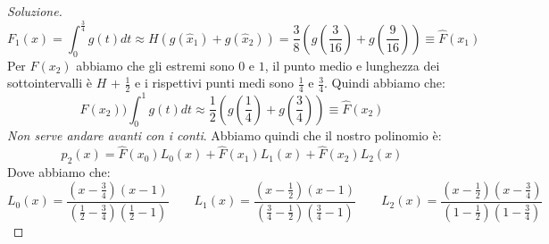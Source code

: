 \documentclass[11pt,a4paper,twoside]{article}
\theoremstyle{definition}
\newenvironment{sol}
	{\renewcommand\qedsymbol{$\blacksquare$}\begin{proof}[Soluzione]}
	{\end{proof}}
\begin{document}
\begin{sol}
	\[ F_1(x) = \int_0^{\frac 34} g(t)dt \approx H(g(\hat x_1) + g(\hat x_2)) = \frac 38 \left( g\left(\frac 3{16}\right) + g\left( \frac 9{16} \right)  \right) \equiv \hat F(x_1) \]
	Per $F(x_2)$ abbiamo che gli estremi sono $0$ e $1$, il punto medio e lunghezza dei sottointervalli è $H$ + $\frac 12$ e i rispettivi punti medi sono $\frac 14$ e $\frac 34$. Quindi abbiamo che:
	\[ F(x_2) ) \int_0^1 g(t)dt \approx \frac 12 \left( g\left(\frac14\right) + g\left(\frac 34\right) \right) \equiv \hat F(x_2) \]
	\textit{Non serve andare avanti con i conti}. Abbiamo quindi che il nostro polinomio è:
	\[ p_2(x) = \hat F(x_0)L_0(x) + \hat F(x_1)L_1(x) + \hat F(x_2)L_2(x) \]
	Dove abbiamo che:
	\[ L_0(x) = \frac{(x-\frac 34)(x-1)}{(\frac 12- \frac 34)(\frac 12 - 1)}\qquad L_1(x) = \frac{(x-\frac 12)(x-1)}{(\frac 34 - \frac 12)(\frac 34 -1)}\qquad L_2(x) = \frac{(x - \frac 12)(x - \frac 34)}{(1-\frac 12)(1-\frac 34)} \]
\end{sol}
\end{document}
